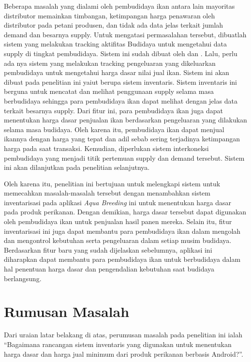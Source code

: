 \begin{spacing}{1.5}
Beberapa masalah yang dialami oleh pembudidaya ikan antara lain mayoritas distributor memainkan timbangan, ketimpangan harga penawaran oleh distributor pada petani produsen, dan tidak ada data jelas terkait jumlah demand dan besarnya supply. Untuk mengatasi permasalahan tersebut, dibuatlah sistem yang melakukan tracking aktifitas Budidaya untuk mengetahui data supply di tingkat pembudidaya. Sistem ini sudah dibuat oleh \citep{andri2022} dan \citep{gian2022}. Lalu, perlu ada nya sistem yang melakukan tracking pengeluaran yang dikeluarkan pembudidaya untuk mengetahui harga dasar nilai jual ikan. Sistem ini akan dibuat pada penelitian ini yaiut berupa sistem inventaris. Sistem inventaris ini berguna untuk mencatat dan melihat penggunaan supply selama masa berbudidaya sehingga para pembudidaya ikan dapat melihat dengan jelas data terkait besarnya supply. Dari fitur ini, para pembudidaya ikan juga dapat menentukan harga dasar penjualan ikan berdasarkan pengeluaran yang dilakukan selama masa budidaya. Oleh karena itu, pembudidaya ikan dapat menjual ikannya dengan harga yang tepat dan adil sebab sering terjadinya ketimpangan harga pada saat transaksi. Kemudian, diperlukan sistem interkoneksi pembudidaya yang menjadi titik pertemuan supply dan demand tersebut. Sistem ini akan dilanjutkan pada penelitian selanjutnya.

Oleh karena itu, penelitian ini bertujuan untuk melengkapi sistem untuk memecahkan masalah-masalah tersebut dengan menambahkan sistem inventarisasi pada aplikasi \textit{Aqua Breeding} ini untuk menentukan harga dasar pada produk perikanan. Dengan demikian, harga dasar tersebut dapat digunakan oleh pembudidaya ikan untuk penjualan hasil panen mereka. Selain itu, fitur inventarisasi ini juga dapat membantu para pembudidaya ikan dalam mengolah dan mengontrol kebutuhan serta pengeluaran dalam setiap musim budidaya. Berdasarkan fitur baru yang sudah dijelaskan sebelumnya, aplikasi ini diharapkan dapat membantu para pembudidaya ikan untuk berbudidaya dalam hal penentuan harga dasar dan pengendalian kebutuhan saat budidaya berlangsung. 

\section{Rumusan Masalah}
Dari uraian latar belakang di atas, perumusan masalah pada penelitian ini ialah “Bagaimana rancangan sistem inventaris yang digunakan untuk menentukan harga dasar dan harga jual minimum dari produk perikanan berbasis Android?”.


\end{spacing}
